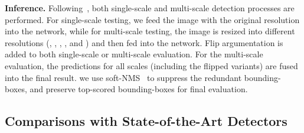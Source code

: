 \documentclass[runningheads]{llncs}
\begin{document}
\noindent\textbf{Inference.} Following~\cite{law2018cornernet}, both single-scale and multi-scale detection processes are performed. For single-scale testing, we feed the image with the original resolution into the network, while for multi-scale testing, the image is resized into different resolutions (, , , , and ) and then fed into the network. Flip argumentation is added to both single-scale or multi-scale evaluation. For the multi-scale evaluation, the predictions for all scales (including the flipped variants) are fused into the final result. we use soft-NMS~\cite{bodla2017soft} to suppress the redundant bounding-boxes, and preserve  top-scored bounding-boxes for final evaluation.
\vspace{-2ex}
\subsection{Comparisons with State-of-the-Art Detectors}
\label{Experiments:Comparisons}
\end{document}
